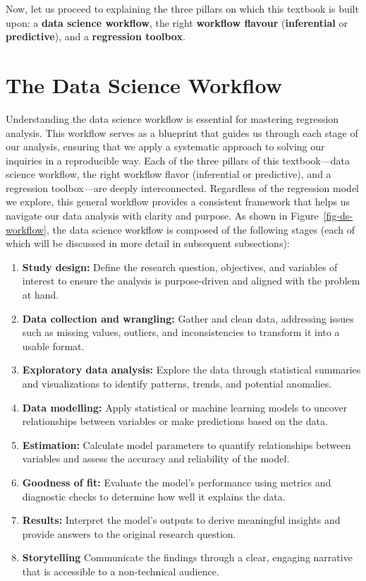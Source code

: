 \documentclass[
  letterpaper,
  DIV=11,
  numbers=noendperiod]{scrreprt}
\providecommand{\tightlist}{%
  \setlength{\itemsep}{0pt}\setlength{\parskip}{0pt}}\usepackage{longtable,booktabs,array}
\begin{document}
Now, let us proceed to explaining the three pillars on which this
textbook is built upon: a \textbf{data science workflow}, the right
\textbf{workflow flavour} (\textbf{inferential} or \textbf{predictive}),
and a \textbf{regression toolbox}.

\section{The Data Science Workflow}\label{sec-ds-workflow}

Understanding the data science workflow is essential for mastering
regression analysis. This workflow serves as a blueprint that guides us
through each stage of our analysis, ensuring that we apply a systematic
approach to solving our inquiries in a reproducible way. Each of the
three pillars of this textbook---data science workflow, the right
workflow flavor (inferential or predictive), and a regression
toolbox---are deeply interconnected. Regardless of the regression model
we explore, this general workflow provides a consistent framework that
helps us navigate our data analysis with clarity and purpose. As shown
in Figure~\ref{fig-ds-workflow}, the data science workflow is composed
of the following stages (each of which will be discussed in more detail
in subsequent subsections):

\begin{enumerate}
\def\labelenumi{\arabic{enumi}.}
\tightlist
\item
  \textbf{Study design:} Define the research question, objectives, and
  variables of interest to ensure the analysis is purpose-driven and
  aligned with the problem at hand.
\item
  \textbf{Data collection and wrangling:} Gather and clean data,
  addressing issues such as missing values, outliers, and
  inconsistencies to transform it into a usable format.
\item
  \textbf{Exploratory data analysis:} Explore the data through
  statistical summaries and visualizations to identify patterns, trends,
  and potential anomalies.
\item
  \textbf{Data modelling:} Apply statistical or machine learning models
  to uncover relationships between variables or make predictions based
  on the data.
\item
  \textbf{Estimation:} Calculate model parameters to quantify
  relationships between variables and assess the accuracy and
  reliability of the model.
\item
  \textbf{Goodness of fit:} Evaluate the model's performance using
  metrics and diagnostic checks to determine how well it explains the
  data.
\item
  \textbf{Results:} Interpret the model's outputs to derive meaningful
  insights and provide answers to the original research question.
\item
  \textbf{Storytelling} Communicate the findings through a clear,
  engaging narrative that is accessible to a non-technical audience.
\end{enumerate}
\end{document}
